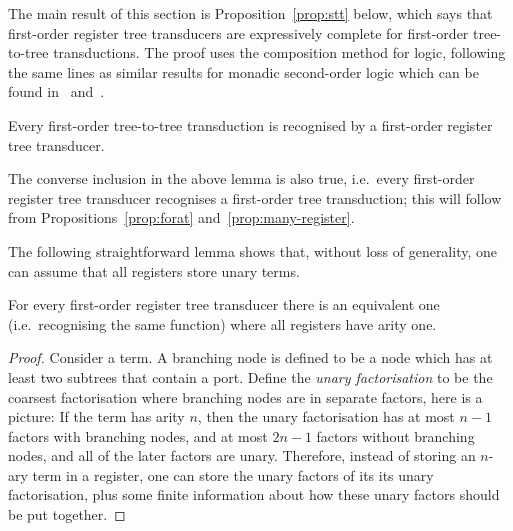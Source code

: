 The main result of this section is Proposition~\ref{prop:stt} below, which says that first-order register tree transducers are expressively complete for first-order tree-to-tree transductions. The proof uses the composition method for logic,  following the same lines as  similar results for monadic second-order logic which can be found in~\cite[Theorem 4.6]{alur2017streaming} and~\cite[Theorem 14]{bloem_comparison_2000}. 

\begin{proposition}\label{prop:stt}
    Every first-order tree-to-tree transduction is recognised by a first-order register tree transducer. 
\end{proposition}
The converse inclusion in the above lemma is also true, i.e.~every first-order register tree transducer recognises a first-order tree transduction; this will follow from Propositions~\ref{prop:forat} and~\ref{prop:many-register}. 

The following straightforward lemma shows that, without loss of generality, one can assume that all registers store unary terms. 
\begin{lemma}\label{lem:unary-registers}
    For every first-order register tree transducer there is an equivalent one (i.e.~recognising the same function) where all registers have arity one. 
\end{lemma}
\begin{proof}
    Consider a term. A branching node is defined to be a node which has at least two subtrees that contain a port. Define the  \emph{unary factorisation} to be the coarsest factorisation where branching nodes are in separate factors, here is a picture:
    If the term has arity $n$, then the unary factorisation has at most $n-1$ factors with branching nodes, and at most $2n-1$ factors without branching nodes, and all of the later factors are unary. Therefore, instead of storing an $n$-ary term in a register, one can store the unary factors of its its unary factorisation, plus some finite information about how these unary factors should be put together. 
\end{proof}


